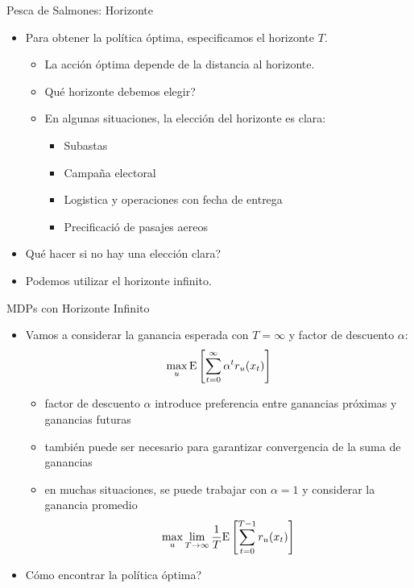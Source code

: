 \documentclass[handout]{beamer}
\begin{document}
\begin{frame}{Pesca de Salmones: Horizonte}
\begin{itemize}
\item Para obtener la política óptima, especificamos el horizonte $T$.
\begin{itemize}
\item<2-> La acción óptima depende de la distancia al horizonte.
\item<3-> Qué horizonte debemos elegir?
\item<4-> En algunas situaciones, la elección del horizonte es clara:
\begin{itemize}
\item Subastas
\item Campaña electoral
\item Logistica y operaciones con fecha de entrega
\item Precificació de pasajes aereos
\end{itemize}
\end{itemize}
\item<5-> Qué hacer si no hay una elección clara?
\item<6-> Podemos utilizar el horizonte infinito.
\end{itemize}
\end{frame}

\begin{frame}{MDPs con Horizonte Infinito}
\begin{itemize}
\item Vamos a considerar la ganancia esperada con $T=\infty$ y factor de descuento $\alpha$:
$$
\max_u {\rm E}\left[\sum_{t=0}^\infty \alpha^t r_u(x_t)\right]
$$
\begin{itemize}
\item<2-> factor de descuento $\alpha$ introduce preferencia entre ganancias próximas y ganancias futuras
\item<3-> también puede ser necesario para garantizar convergencia de la suma de ganancias
\item<4-> en muchas situaciones, se puede trabajar con $\alpha=1$ y considerar la ganancia promedio
$$
\max_u \lim_{T\rightarrow \infty} \frac{1}{T} {\rm E}\left[\sum_{t=0}^{T-1} r_u(x_t)\right]
$$
\end{itemize}
\item<5-> Cómo encontrar la política óptima?
\end{itemize}
\end{frame}
\end{document}
